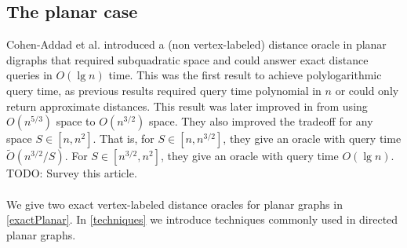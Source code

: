 \subsection{The planar case}\label{cohenplanar}
Cohen-Addad et al. \cite{cohen2017fast} introduced a (non vertex-labeled) distance
oracle in planar digraphs that required subquadratic space and could answer exact distance queries in
$O(\lg n)$ time. This was the first result to achieve polylogarithmic query time, as previous
results required query time polynomial in $n$ or could only return approximate distances.
This result was later improved in \cite{gawrychowski2017better} from using $O(n^{5/3})$
space to $O(n^{3/2})$ space. They also improved the tradeoff for any space $S\in [n,n^2]$.
That is, for $S\in [n, n^{3/2}]$, they give an oracle with query time
$\tilde{O}(n^{3/2}/S)$. For $S\in [n^{3/2}, n^2]$, they give an oracle with query time
$O(\lg n)$. TODO: Survey this article.\\
\\
We give two exact vertex-labeled distance oracles for planar graphs in \ref{exactPlanar}. In
\ref{techniques} we introduce techniques commonly used in directed planar graphs.

